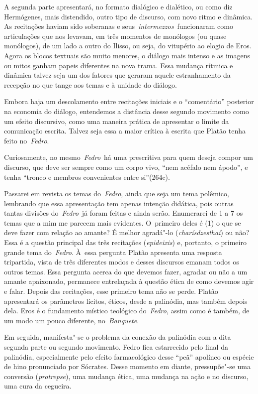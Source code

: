 A segunda parte apresentará, no formato dialógico e dialético, ou como
diz Hermógenes, mais distendido, outro tipo de discurso, com novo ritmo
e dinâmica. As recitações haviam sido soberanas e
seus~\emph{intermezzos}~funcionaram como articulações que nos levavam,
em três momentos de monólogos (ou quase monólogos), de um lado a outro
do Ilisso, ou seja, do vitupério ao elogio de Eros. Agora os blocos
textuais são muito menores, o diálogo mais intenso e as imagens ou mitos
ganham papeis diferentes na nova trama. Essa mudança rítmica e dinâmica
talvez seja um dos fatores que geraram aquele estranhamento da recepção
no que tange aos temas e à unidade do diálogo.

Embora haja um descolamento entre recitações iniciais e o ``comentário''
posterior na economia do diálogo, entendemos a distância desse segundo
movimento como um efeito discursivo, como uma maneira prática de
apresentar o limite da comunicação escrita. Talvez seja essa a maior
crítica à escrita que Platão tenha feito no~\emph{Fedro}.

Curiosamente, no mesmo~\emph{Fedro}~há uma prescritiva para quem deseja
compor um discurso, que deve ser sempre como um corpo vivo, ``nem
acéfalo nem ápodo'', e tenha ``tronco e membros convenientes entre
si''(264c).

Passarei em revista os temas do~\emph{Fedro}, ainda que seja um tema
polêmico, lembrando que essa apresentação tem apenas intenção didática,
pois outras tantas divisões do~\emph{Fedro}~já foram feitas e ainda
serão. Enumerarei de 1 a 7 os temas que a mim me parecem mais evidentes.
O~primeiro deles é (1) o que se deve fazer com relação ao amante? É
melhor agradá"-lo (\emph{charísdzesthai}) ou não? Essa é a questão
principal das três recitações (\emph{epideixis}) e, portanto, o primeiro
grande tema do~\emph{Fedro}. À~essa pergunta Platão apresenta uma
resposta tripartida, vista de três diferentes modos e desses discursos
emanam todos os outros temas. Essa pergunta acerca do que devemos fazer,
agradar ou não a um amante apaixonado, permanece entrelaçada à questão
ética de como devemos agir e falar. Depois das recitações, esse primeiro
tema não se perde. Platão apresentará os parâmetros lícitos, éticos,
desde a palinódia, mas também depois dela. Eros é o fundamento místico
teológico do~\emph{Fedro}, assim como é também, de um modo um pouco
diferente, no~\emph{Banquete}.

Em seguida, manifesta"-se o problema da conexão da palinódia com a dita
segunda parte ou segundo movimento. Fedro fica estarrecido pelo final da
palinódia, especialmente pelo efeito farmacológico desse ``peã''
apolíneo ou espécie de hino pronunciado por Sócrates. Desse momento em
diante, pressupõe"-se uma conversão (\emph{protrepse}), uma mudança
ética, uma mudança na ação e no discurso, uma cura da cegueira.

